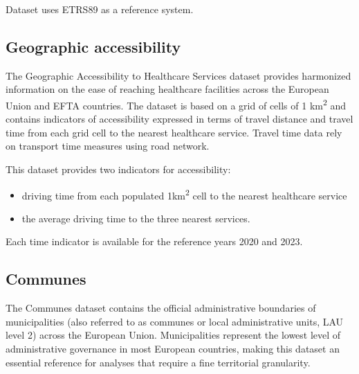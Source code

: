 Dataset uses ETRS89 as a reference system.


\subsection{Geographic accessibility}
\label{subsec:geo_acc_datas_pres}

The Geographic Accessibility to Healthcare Services dataset provides harmonized information on the ease of reaching healthcare facilities across the European Union and EFTA countries. 
The dataset is based on a grid of cells of 1 km\textsuperscript{2} and contains indicators of accessibility expressed in terms of travel distance and travel time from each grid cell to the nearest healthcare service.
Travel time data rely on transport time measures using road network.

This dataset provides two indicators for accessibility:
\begin{itemize}
	\item driving time from each populated 1km\textsuperscript{2} cell to the nearest healthcare service
	\item the average driving time to the three nearest services.
\end{itemize}

Each time indicator is available for the reference years 2020 and 2023.

\subsection{Communes}

The Communes dataset contains the official administrative boundaries of municipalities (also referred to as communes or local administrative units, LAU level 2) across the European Union. 
Municipalities represent the lowest level of administrative governance in most European countries, making this dataset an essential reference for analyses that require a fine territorial granularity.

